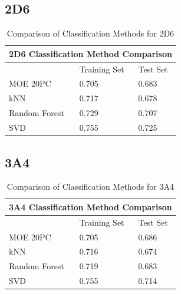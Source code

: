 \subsection{2D6}

\begin{table}[h]
\begin{tabular}{|l|l|l|}
\hline
\multicolumn{3}{|c|}{2D6 Classification Method Comparison} \\ \hline
          & Training Set & Test Set \\ \hline
MOE 20PC  & 0.705        & 0.683    \\ \hline
kNN       & 0.717        & 0.678    \\ \hline
Random Forest & 0.729    & 0.707    \\ \hline
SVD       & 0.755        & 0.725    \\ \hline
\end{tabular}
\caption{Comparison of Classification Methods for 2D6}
\end{table}

\subsection{3A4}

\begin{table}[h]
\begin{tabular}{|l|l|l|}
\hline
\multicolumn{3}{|c|}{3A4 Classification Method Comparison} \\ \hline
          & Training Set & Test Set \\ \hline
MOE 20PC  & 0.705        & 0.686    \\ \hline
kNN       & 0.716        & 0.674    \\ \hline
Random Forest & 0.719    & 0.683    \\ \hline
SVD       & 0.755        & 0.714    \\ \hline
\end{tabular}
\caption{Comparison of Classification Methods for 3A4}
\end{table}



